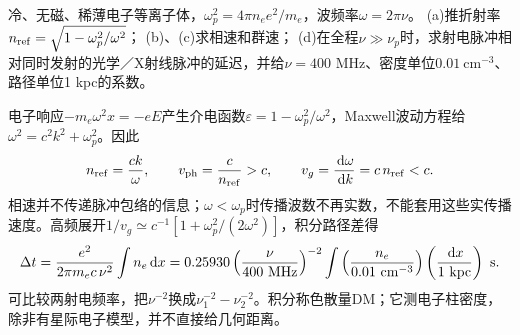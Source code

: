 \begin{exercise}
冷、无磁、稀薄电子等离子体，$\omega_p^2=4\pi n_e e^2/m_e$，波频率$\omega=2\pi\nu$。
(a)推折射率$n_{\rm ref}=\sqrt{1-\omega_p^2/\omega^2}$；
(b)、(c)求相速和群速；
(d)在全程$\nu\gg\nu_p$时，求射电脉冲相对同时发射的光学／X射线脉冲的延迟，并给$\nu=400$ MHz、密度单位$0.01\ \mathrm{cm^{-3}}$、路径单位1 kpc的系数。
\end{exercise}
\begin{solution}
电子响应$-m_e\omega^2x=-eE$产生介电函数$\varepsilon=1-\omega_p^2/\omega^2$，Maxwell波动方程给$\omega^2=c^2k^2+\omega_p^2$。因此
\[
 n_{\rm ref}=\frac{ck}{\omega},\qquad
 v_{\rm ph}=\frac c{n_{\rm ref}}>c,\qquad
 v_g=\frac{\,\mathrm d\omega}{\,\mathrm d k}=c\,n_{\rm ref}<c .
\]
相速并不传递脉冲包络的信息；$\omega<\omega_p$时传播波数不再实数，不能套用这些实传播速度。高频展开$1/v_g\simeq c^{-1}[1+\omega_p^2/(2\omega^2)]$，积分路径差得
\[
 \Delta t=\frac{e^2}{2\pi m_ec\,\nu^2}\int n_e\,\mathrm d x
 =0.25930\left(\frac{\nu}{400\ {\rm MHz}}\right)^{-2}
 \int\left(\frac{n_e}{0.01\ \mathrm{cm^{-3}}}\right)
 \left(\frac{\,\mathrm d x}{1\ {\rm kpc}}\right)\ {\rm s}.
\]
可比较两射电频率，把$\nu^{-2}$换成$\nu_1^{-2}-\nu_2^{-2}$。积分称色散量DM；它测电子柱密度，除非有星际电子模型，并不直接给几何距离。
\end{solution}
